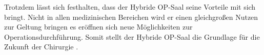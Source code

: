 Trotzdem lässt sich festhalten, dass der Hybride OP-Saal seine Vorteile mit sich bringt. Nicht in allen medizinischen Bereichen wird er einen gleichgroßen Nutzen zur Geltung bringen es eröffnen sich neue Möglichkeiten zur Operationsdurchführung. Somit stellt der Hybride OP-Saal die Grundlage für die Zukunft der Chirurgie \cite{ORofTheFuture}.





 





